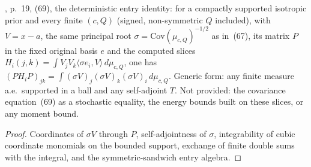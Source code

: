 \begin{lemma}
  \label{lem:bkl-noise-entries}
  \leanok
  \cite{BizeulKlartagLehec2026}, p.~19, (69), the deterministic entry identity: for a compactly supported isotropic prior
  and every finite $(c,Q)$ (signed, non-symmetric $Q$ included), with $V=x-a$, the same principal root
  $\sigma=\mathrm{Cov}(\mu_{c,Q})^{-1/2}$ as in~(67), its matrix $P$ in the fixed original basis $e$ and the computed
  slices $H_i(j,k)=\int V_jV_k\langle\sigma e_i,V\rangle\,d\mu_{c,Q}$, one has
  $(PH_iP)_{jk}=\int(\sigma V)_j(\sigma V)_k(\sigma V)_i\,d\mu_{c,Q}$.  Generic form: any finite measure a.e.\ supported
  in a ball and any self-adjoint $T$.  Not provided: the covariance equation~(69) as a stochastic equality, the energy
  bounds built on these slices, or any moment bound.
\end{lemma}
\begin{proof}
  \leanok
  Coordinates of $\sigma V$ through $P$, self-adjointness of $\sigma$, integrability of cubic coordinate monomials on the
  bounded support, exchange of finite double sums with the integral, and the symmetric-sandwich entry algebra.
\end{proof}

